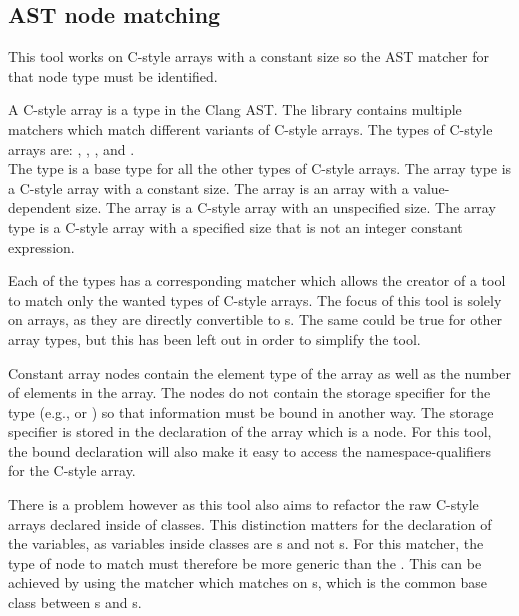 \subsection{AST node matching}\label{subsec:085tool_example:030cstyle:node_matching}

This tool works on C-style arrays with a constant size so the AST matcher for that node type must be identified.

A C-style array is a type in the Clang AST. The library contains multiple matchers which match different variants of C-style arrays. The types of C-style arrays are: , , ,  and . \\
The  type is a base type for all the other types of C-style arrays. The  array type is a C-style array with a constant size. The  array is an array with a value-dependent size. The  array is a C-style array with an unspecified size. The  array type is a C-style array with a specified size that is not an integer constant expression.

Each of the types has a corresponding matcher which allows the creator of a tool to match only the wanted types of C-style arrays. The focus of this tool is solely on  arrays, as they are directly convertible to s. The same could be true for other array types, but this has been left out in order to simplify the tool.

Constant array nodes contain the element type of the array as well as the number of elements in the array. The nodes do not contain the storage specifier for the type (e.g.,  or ) so that information must be bound in another way. The storage specifier is stored in the declaration of the array which is a  node. For this tool, the bound declaration will also make it easy to access the namespace-qualifiers for the C-style array. 

There is a problem however as this tool also aims to refactor the raw C-style arrays declared inside of classes. This distinction matters for the declaration of the variables, as variables inside classes are s and not s. For this matcher, the type of node to match must therefore be more generic than the . This can be achieved by using the  matcher which matches on s, which is the common base class between s and s.

